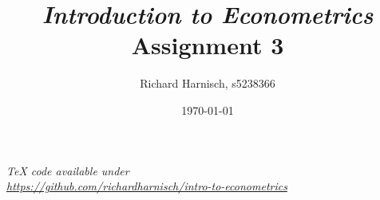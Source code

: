 \documentclass[a4paper]{article}
\begin{document}
\title{\textit{Introduction to Econometrics}\\Assignment 3}
\author{Richard Harnisch, s5238366}
\date{\today}
\maketitle

\makeatletter
\newcommand{\answer}[1]{%
    \par\medskip
    \noindent
    \hspace*{-\@totalleftmargin}%
    \fbox{%
        \parbox{\dimexpr\textwidth-2\fboxsep-2\fboxrule}{#1}%
    }%
    \par\medskip
}
\makeatother

\noindent\textit{TeX code available under\\ \url{https://github.com/richardharnisch/intro-to-econometrics}}
\end{document}
